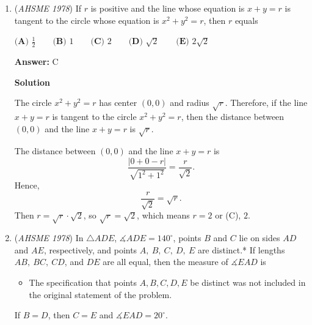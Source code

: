 \begin{enumerate}
 \textbf{Answer: }B



\textbf{Solution}

Begin by drawing circle P and point B. To satisfy the conditions of the problem, A needs to be in a position where it is closer to B. This can only happen if A and B are on the same line, so we choose from answer choices A and B. 

 We can pick some arbitrary point A outside circle P that is collinear with B and see that the conditions still hold, so the answer is $\boxed{\textbf{(B)}}.$



	\item (\textit{AHSME 1978}) If $r$ is positive and the line whose equation is $x + y = r$ is tangent to the circle whose equation is $x^2 + y ^2 = r$, then $r$ equals


 $\textbf{(A) }\frac{1}{2}\qquad \textbf{(B) }1\qquad \textbf{(C) }2\qquad \textbf{(D) }\sqrt{2}\qquad  \textbf{(E) }2\sqrt{2}$

 \textbf{Answer: }C



\textbf{Solution}

The circle $x^2 + y^2 = r$ has center $(0,0)$ and radius $\sqrt{r}$. Therefore, if the line $x + y = r$ is tangent to the circle $x^2 + y^2 = r$, then the distance between $(0,0)$ and the line $x + y = r$ is $\sqrt{r}$.

 The distance between $(0,0)$ and the line $x + y = r$ is
 \[\frac{|0 + 0 - r|}{\sqrt{1^2 + 1^2}} = \frac{r}{\sqrt{2}}.\]Hence,
 \[\frac{r}{\sqrt{2}} = \sqrt{r}.\]Then $r = \sqrt{r} \cdot \sqrt{2}$, so $\sqrt{r} = \sqrt{2}$, which means $r = \boxed{2}$ or (C), $2$.

 


	\item (\textit{AHSME 1978}) In $\triangle ADE$, $\measuredangle ADE=140^\circ$, points $B$ and $C$ lie on sides $AD$ and $AE$, 
respectively, and points $A,~B,~C,~D,~E$ are distinct.* If lengths $AB,~BC,~CD$, and $DE$ are all equal, 
then the measure of $\measuredangle EAD$ is


 
            \begin{itemize}
        \item The specification that points $A,B,C,D,E$ be distinct was not included in the original statement of the problem.
            \end{itemize}
            If $B=D$, then $C=E$ and $\measuredangle EAD=20^\circ$.     



\end{enumerate}
